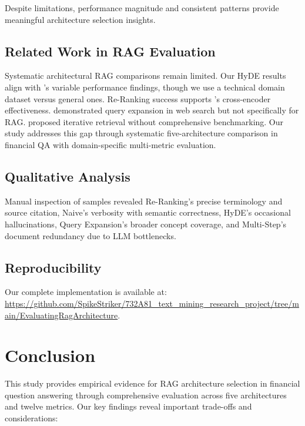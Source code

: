 \documentclass[11pt]{article}
\begin{document}
Despite limitations, performance magnitude and consistent patterns provide 
meaningful architecture selection insights.

\subsection{Related Work in RAG Evaluation}
Systematic architectural RAG comparisons remain limited. Our HyDE results align 
with \citet{gao2023hyde}'s variable performance findings, though we use a technical 
domain dataset versus general ones. Re-Ranking success supports \citet{nogueira2019multi}'s 
cross-encoder effectiveness. \citet{zhuang2023query} demonstrated query expansion in 
web search but not specifically for RAG. \citet{jiang2023retrieval} proposed iterative 
retrieval without comprehensive benchmarking. Our study addresses this gap through 
systematic five-architecture comparison in financial QA with domain-specific 
multi-metric evaluation.

\subsection{Qualitative Analysis}
Manual inspection of samples revealed Re-Ranking's precise terminology and 
source citation, Naive's verbosity with semantic correctness, HyDE's occasional 
hallucinations, Query Expansion's broader concept coverage, and Multi-Step's 
document redundancy due to LLM bottlenecks.

\subsection{Reproducibility}
Our complete implementation is available at: \url{https://github.com/SpikeStriker/732A81_text_mining_research_project/tree/main/EvaluatingRagArchitecture}. 

\section{Conclusion}

This study provides empirical evidence for RAG architecture selection in 
financial question answering through comprehensive evaluation across five 
architectures and twelve metrics. Our key findings reveal important 
trade-offs and considerations:
\end{document}
